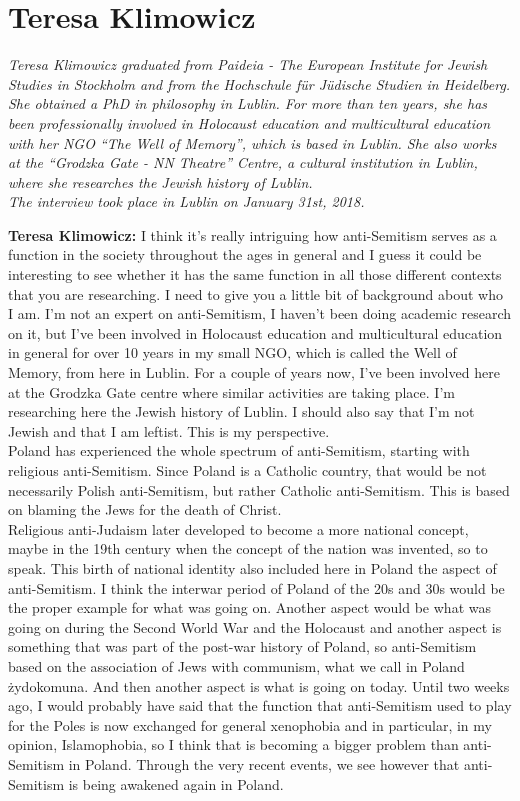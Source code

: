 \section{Teresa Klimowicz}

\textit{Teresa Klimowicz graduated from Paideia - The European Institute for Jewish Studies in Stockholm and from the Hochschule für Jüdische Studien in Heidelberg. She obtained a PhD in philosophy in Lublin. For more than ten years, she has been professionally involved in Holocaust education and multicultural education with her NGO ``The Well of Memory'', which is based in Lublin. She also works at the ``Grodzka Gate - NN Theatre'' Centre, a cultural institution in Lublin, where she researches the Jewish history of Lublin. \\ 
The interview took place in Lublin on January 31st, 2018.}\par
\vspace*{2em}
\textbf{Teresa Klimowicz:} I think it's really intriguing how anti-Semitism serves as a function in the society throughout the ages in general and I guess it could be interesting to see whether it has the same function in all those different contexts that you are researching. I need to give you a little bit of background about who I am. I'm not an expert on anti-Semitism, I haven't been doing academic research on it, but I've been involved in Holocaust education and multicultural education in general for over 10 years in my small NGO, which is called the Well of Memory, from here in Lublin. For a couple of years now, I've been involved here at the Grodzka Gate centre where similar activities are taking place. I'm researching here the Jewish history of Lublin. I should also say that I'm not Jewish and that I am leftist. This is my perspective.\\
Poland has experienced the whole spectrum of anti-Semitism, starting with religious anti-Semitism. Since Poland is a Catholic country, that would be not necessarily Polish anti-Semitism, but rather Catholic anti-Semitism. This is based on blaming the Jews for the death of Christ.\\
Religious anti-Judaism later developed to become a more national concept, maybe in the 19th century when the concept of the nation was invented, so to speak. This birth of national identity also included here in Poland the aspect of anti-Semitism. I think the interwar period of Poland of the 20s and 30s would be the proper example for what was going on. Another aspect would be what was going on during the Second World War and the Holocaust and another aspect is something that was part of the post-war history of Poland, so anti-Semitism based on the association of Jews with communism, what we call in Poland żydokomuna. And then another aspect is what is going on today. Until two weeks ago, I would probably have said that the function that anti-Semitism used to play for the Poles is now exchanged for general xenophobia and in particular, in my opinion, Islamophobia, so I think that is becoming a bigger problem than anti-Semitism in Poland. Through the very recent events, we see however that anti-Semitism is being awakened again in Poland.  

